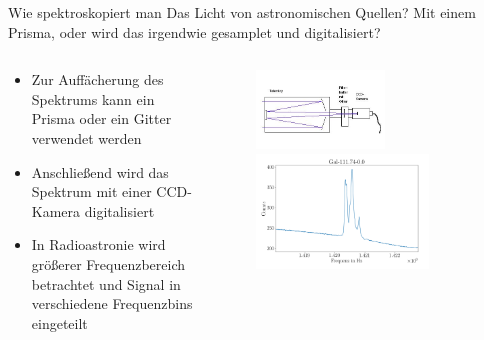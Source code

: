   \begin{frame}{Wie spektroskopiert man Das Licht von astronomischen Quellen? Mit einem Prisma, oder wird das irgendwie gesamplet und digitalisiert?}
    \begin{columns}
   \begin{column}{0.5\textwidth}
    \begin{itemize}
      \setlength\itemsep{2em}
      \item Zur Auffächerung des Spektrums kann ein Prisma oder ein Gitter verwendet werden
      \item Anschließend wird das Spektrum mit einer CCD-Kamera digitalisiert
      \item In Radioastronie wird größerer Frequenzbereich betrachtet und Signal in verschiedene Frequenzbins eingeteilt
     \end{itemize}
  \vspace{2em}
  \end{column}
  \begin{column}{0.5\textwidth}
  \begin{figure}
    \centering
    \includegraphics[width=0.6\textwidth]{images/spektroskopie.png}\\
    \includegraphics[width=0.8\textwidth]{images/gal_111_addiert.png}
  \end{figure}
  \end{column}
    \end{columns}
  \end{frame}

